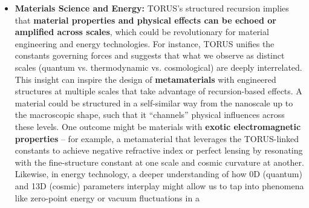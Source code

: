 \documentclass[
]{article}
\begin{document}
{\begin{itemize}
  light-speed or causal constraints, aligning with the universe's
  inherent \emph{toroidal frequencies} might reduce attenuation or
  bypass some environmental noise by essentially using the universe's
  own ``rhythm'' for signal coherence. This could lead to
  \textbf{ultra-long-range communication} techniques -- for example,
  modulating signals on gravitational waves or other carriers that TORUS
  links to quantum processes. If the entire history of the universe is
  one self-contained resonant system, then a communications device tuned
  to that system might achieve reach or stability unimaginable with
  traditional methods. Even more modestly, understanding recursion could
  improve existing technology like GPS and deep-space communication:
  knowing if fundamental constants vary slightly in different
  gravitational conditions (as TORUS hints\hspace{0pt}) would allow
  corrections and modulation schemes that keep signals stable across
  those variations. In sum, TORUS provides a theoretical blueprint for
  communications that are \textbf{observer-aware and multi-scale},
  treating information transfer as part of a cosmic feedback loop rather
  than an isolated point-to-point exchange.
\item
  \textbf{Materials Science and Energy:} TORUS's structured recursion
  implies that \textbf{material properties and physical effects can be
  echoed or amplified across scales}, which could be revolutionary for
  material engineering and energy technologies. For instance, TORUS
  unifies the constants governing forces and suggests that what we
  observe as distinct scales (quantum vs. thermodynamic vs.
  cosmological) are deeply interrelated\hspace{0pt}. This insight can
  inspire the design of \textbf{metamaterials} with engineered
  structures at multiple scales that take advantage of recursion-based
  effects. A material could be structured in a self-similar way from the
  nanoscale up to the macroscopic shape, such that it ``channels''
  physical influences across these levels. One outcome might be
  materials with \textbf{exotic electromagnetic properties} -- for
  example, a metamaterial that leverages the TORUS-linked constants to
  achieve negative refractive index or perfect lensing by resonating
  with the fine-structure constant at one scale and cosmic curvature at
  another. Likewise, in energy technology, a deeper understanding of how
  0D (quantum) and 13D (cosmic) parameters interplay might allow us to
  tap into phenomena like zero-point energy or vacuum fluctuations in a

\end{itemize}}
\end{document}
